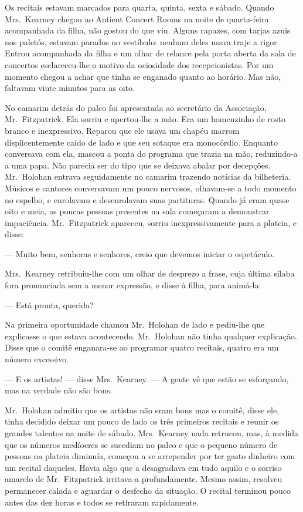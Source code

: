 Os recitais estavam marcados para quarta, quinta, sexta e sábado.  Quando 
Mrs.~Kearney chegou ao Antient Concert Rooms na noite de quarta-feira acompanhada da
filha, não gostou do que viu.  Alguns rapazes, com tarjas azuis nos paletós,
estavam parados no vestíbulo: nenhum deles usava traje a rigor.  Entrou
acompanhada da filha e um olhar de relance pela porta aberta da sala de
concertos esclareceu-lhe o motivo da ociosidade dos recepcionistas.  Por um
momento chegou a achar que tinha se enganado quanto ao horário.  Mas não,
faltavam vinte minutos para as oito.

No camarim detrás do palco foi apresentada ao secretário da Associação, Mr.~Fitzpatrick.  
Ela sorriu e apertou-lhe a mão.  Era um homenzinho de rosto
branco e inexpressivo.  Reparou que ele usava um chapéu marrom displicentemente
caído de lado e que seu sotaque era monocórdio.  Enquanto conversava com ela,
mascou a ponta do programa que trazia na mão, reduzindo-a a uma papa.  Não
parecia ser do tipo que se deixava abalar por decepções.  Mr.~Holohan entrava
seguidamente no camarim trazendo notícias da bilheteria.  Músicos e cantores
conversavam um pouco nervosos, olhavam-se a todo momento no espelho, e
enrolavam e desenrolavam suas partituras.  Quando já eram quase oito e meia, as
poucas pessoas presentes na sala começaram a demonstrar impaciência.  
Mr.~Fitzpatrick apareceu, sorriu inexpressivamente para a plateia, e disse:

--- Muito bem, senhoras e senhores, creio que devemos iniciar o espetáculo.

Mrs.~Kearney retribuiu-lhe com um olhar de desprezo a frase, cuja última sílaba
fora pronunciada sem a menor expressão, e disse à filha, para animá-la:

--- Está pronta, querida?

Na primeira oportunidade chamou Mr.~Holohan de lado e pediu-lhe que explicasse
o que estava acontecendo.  Mr.~Holohan não tinha qualquer explicação.  Disse
que o comitê enganara-se ao programar quatro recitais, quatro era um número
excessivo.

--- E os artistas! --- disse Mrs.~Kearney.  --- A gente vê que estão se
esforçando, mas na verdade não são bons.

Mr.~Holohan admitiu que os artistas não eram bons mas o comitê, disse ele,
tinha decidido deixar um pouco de lado os três primeiros recitais e reunir os
grandes talentos na noite de sábado.  Mrs.~Kearney nada retrucou, mas, à medida
que os números medíocres se sucediam no palco e que o pequeno número de pessoas
na plateia diminuía, começou a se arrepender por ter gasto dinheiro com um
recital daqueles.  Havia algo que a desagradava em tudo aquilo e o sorriso
amarelo de Mr.~Fitzpatrick irritava-a profundamente.  Mesmo assim, resolveu
permanecer calada e aguardar o desfecho da situação.  O recital terminou pouco
antes das dez horas e todos se retiraram rapidamente.

